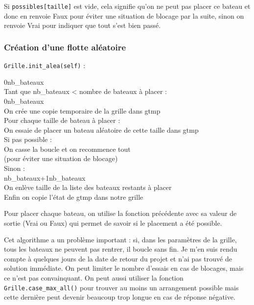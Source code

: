 Si \texttt{possibles[taille]} est vide, cela signifie qu'on ne peut pas placer ce bateau et donc en renvoie Faux pour éviter une situation de blocage par la suite, sinon on renvoie Vrai pour indiquer que tout s'est bien passé.




\subsubsection{Création d'une flotte aléatoire}\label{init_alea}
\texttt{Grille.init\_alea(self)} :
\begin{algo1}
0\sto nb\_bateaux\\
Tant que nb\_bateaux < nombre de bateaux à placer :\\
0\sto nb\_bateaux\\
On crée une copie temporaire de la grille dans gtmp\\
Pour chaque taille de bateau à placer :\\
On essaie de placer un bateau aléatoire de cette taille dans gtmp\\
Si pas possible :\\
On casse la boucle et on recommence tout\\
(pour éviter une situation de blocage)\\
Sinon :\\
nb\_bateaux+1\sto nb\_bateaux\\
On enlève taille de la liste des bateaux restants à placer\\
Enfin on copie l'état de gtmp dans notre grille \\
\end{algo1}

Pour placer chaque bateau, on utilise la fonction précédente avec sa valeur de sortie (Vrai ou Faux) qui permet de savoir si le placement a été possible.

\medskip

Cet algorithme a un problème important : si, dans les paramètres de la grille, tous les bateaux ne peuvent pas rentrer, il boucle sans fin. Je m'en suis rendu compte à quelques jours de la date de retour du projet et n'ai pas trouvé de solution immédiate. On peut limiter le nombre d'essais en cas de blocages, mais ce n'est pas convainquant. On peut aussi utiliser la fonction \texttt{Grille.case\_max\_all()} pour trouver au moins un arrangement possible mais cette dernière peut devenir beaucoup trop longue en cas de réponse négative.

